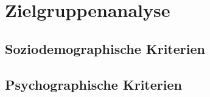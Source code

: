 \section{Zielgruppenanalyse}


\subsection{Soziodemographische Kriterien}


\subsection{Psychographische Kriterien}